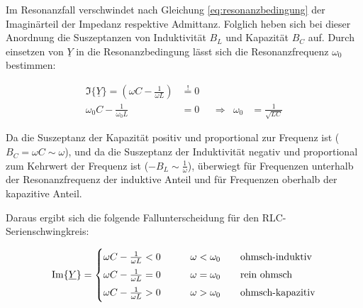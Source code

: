\begin{frame}
{            Im Resonanzfall verschwindet nach Gleichung \ref{eq:resonanzbedingung} der Imaginärteil der Impedanz respektive Admittanz.
            Folglich heben sich bei dieser Anordnung die Suszeptanzen von Induktivität $B_L$ und Kapazität $B_C$ auf.
            Durch einsetzen von $\underline{Y}$ in die Resonanzbedingung lässt sich die Resonanzfrequenz $\omega_0$ bestimmen:
        
            \begin{equation}\label{eq:rlcp:w0}
                \begin{aligned}
                    \Im\{\underline{Y}\} = \left(\omega C - \frac{1}{\omega L}\right) &\overset{!}{=} 0 \\
                    \omega_0 C - \frac{1}{\omega_0 L} &= 0 &&\Rightarrow& \omega_0 &= \frac{1}{\sqrt{LC}}
                \end{aligned}
            \end{equation}
        
            Da die Suszeptanz der Kapazität positiv und proportional zur Frequenz ist ($B_C = \omega C \sim \omega$),
            und da die Suszeptanz der Induktivität negativ und proportional zum Kehrwert der Frequenz ist ($-B_L \sim \frac{1}{\omega}$),
            überwiegt für Frequenzen unterhalb der Resonanzfrequenz der induktive Anteil und für Frequenzen oberhalb der kapazitive Anteil.
        
            Daraus ergibt sich die folgende Fallunterscheidung für den RLC-Serienschwingkreis:
        
            \begin{equation}
                \Im\{\underline{Y}\} =
            \begin{cases}
                \omega C - \frac{1}{\omega L} < 0 & \qquad \omega < \omega_0 \qquad\text{ohmsch-induktiv}\vphantom{\Big|}\\
                \omega C - \frac{1}{\omega L} = 0 & \qquad \omega = \omega_0 \qquad\text{rein ohmsch}\vphantom{\Big|}\\
                \omega C - \frac{1}{\omega L} > 0 & \qquad \omega > \omega_0 \qquad\text{ohmsch-kapazitiv}\vphantom{\Big|}
            \end{cases}
            \label{eq:rlcp:fallunterscheidung}
            \end{equation}
        
}
\end{frame}
